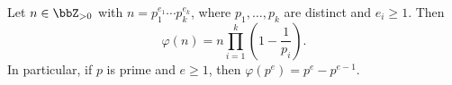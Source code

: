 \begin{proposition} \label{proposition:formula_for_euler_totient_function}
    Let $n \in \bbZ_{>0}$ with  $n = p_1^{e_1} \cdots p_k^{e_k}$, where $p_1, \dots, p_k$ are distinct  and $e_i \geq 1$. Then
    $$\varphi(n) = n \prod_{i=1}^k \left(1 - \frac{1}{p_i}\right).$$
    In particular, if $p$ is prime and $e \geq 1$, then $\varphi(p^e) = p^e - p^{e-1}$.
\end{proposition}
